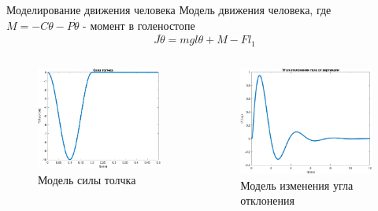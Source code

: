 \documentclass[10pt]{beamer}
\begin{document}
\begin{frame}{Моделирование движения человека}
	Модель движения человека, где $M=-C\theta-P\dot\theta$ - момент в голеностопе
		$$J\ddot{\theta}=mgl\theta+M-Fl_1$$
	\begin{columns}
		\begin{figure}[h!]
			\includegraphics[width=1\linewidth]{images/pushes_my_1.png}
			\caption{Модель силы толчка}
		\end{figure}
		\begin{figure}[h!]
			\includegraphics[width=1\linewidth]{images/deg_my_1.png}
			\caption{Модель изменения угла отклонения}
		\end{figure}
	\end{columns}
\end{frame}
\end{document}
